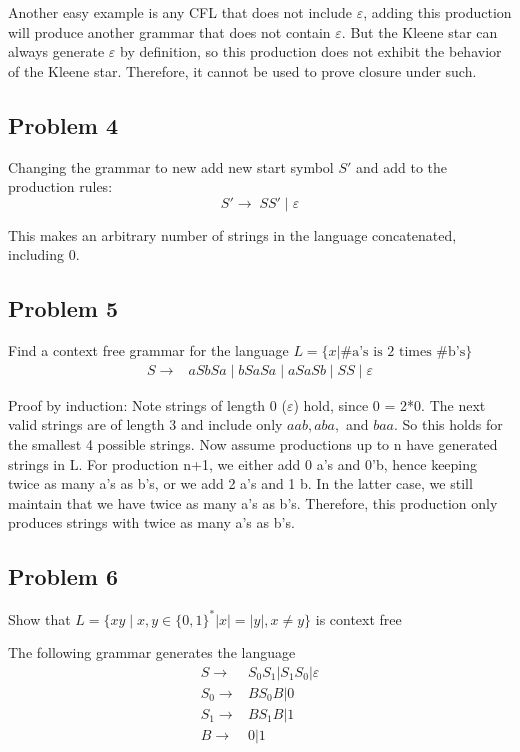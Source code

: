\documentclass[english]{article}
\begin{document}
Another easy example is any CFL that does not include $\varepsilon$, adding this production will produce another grammar that does not contain $\varepsilon$. But the Kleene star can always generate $\varepsilon$ by definition, so this production does not exhibit the behavior of the Kleene star. Therefore, it cannot be used to prove closure under such.

\subsection*{Problem 4}
Changing the grammar to new add new start symbol $S'$ and add to the production rules:
\[ S' \rightarrow \; SS' \; | \; \varepsilon \]

This makes an arbitrary number of strings in the language concatenated, including 0.

\subsection*{Problem 5}
Find a context free grammar for the language \(L = \{ x | \textrm{\#a's is 2 times \#b's}\}\)
\begin{align*}
S \rightarrow & aSbSa \;|\; bSaSa \;|\; aSaSb \;|\; SS \;|\; \varepsilon
\end{align*}

Proof by induction: Note strings of length 0 ($\varepsilon$) hold, since 0 = 2*0. The next valid strings are of length 3 and include only $aab, aba,$ and $baa$. So this holds for the smallest 4 possible strings. Now assume productions up to n have generated strings in L. For production n+1, we either add 0 a's and 0'b, hence keeping twice as many a's as b's, or we add 2 a's and 1 b. In the latter case, we still maintain that we have twice as many a's as b's. Therefore, this production only produces strings with twice as many a's as b's.

\subsection*{Problem 6}
Show that \(L = \{ xy \mid x,y \in \{0,1\}^* |x| = |y|, x \neq y \}\) is context free

The following grammar generates the language
\begin{align*}
S \rightarrow & S_0 S_1 | S_1 S_0 | \varepsilon \\
S_0 \rightarrow & B S_0 B | 0 \\
S_1 \rightarrow & B S_1 B | 1 \\
B \rightarrow & 0 | 1
\end{align*}
\end{document}
